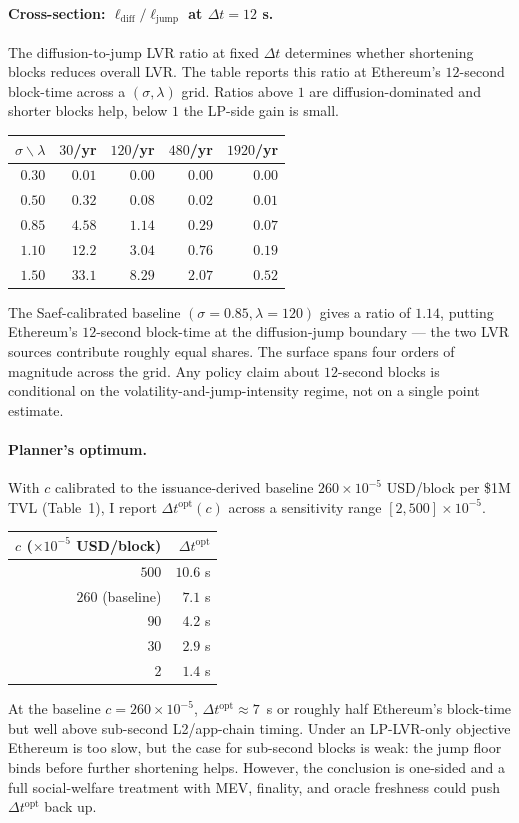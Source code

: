 \documentclass[runningheads]{llncs}
\newcommand{\dt}{\Delta t}
\newcommand{\1}{\mathbf{1}}
\begin{document}
\paragraph{Cross-section: $\ell_{\text{diff}}/\ell_{\text{jump}}$ at $\dt = 12$ s.}
The diffusion-to-jump LVR ratio at fixed $\dt$ determines whether shortening blocks reduces overall LVR. The table reports this ratio at Ethereum's $12$-second block-time across a $(\sigma, \lambda)$ grid. Ratios above $1$ are diffusion-dominated and shorter blocks help, below $1$ the LP-side gain is small.
\begin{center}
\begin{tabular}{r|rrrr}
\toprule
$\sigma\backslash\lambda$ & $30$/yr & $120$/yr & $480$/yr & $1920$/yr \\
\midrule
$0.30$ & $0.01$ & $0.00$ & $0.00$ & $0.00$ \\
$0.50$ & $0.32$ & $0.08$ & $0.02$ & $0.01$ \\
$0.85$ & $4.58$ & $1.14$ & $0.29$ & $0.07$ \\
$1.10$ & $12.2$ & $3.04$ & $0.76$ & $0.19$ \\
$1.50$ & $33.1$ & $8.29$ & $2.07$ & $0.52$ \\
\bottomrule
\end{tabular}
\end{center}
The Saef-calibrated baseline $(\sigma = 0.85,\lambda = 120)$ gives a ratio of $1.14$, putting Ethereum's $12$-second block-time at the diffusion-jump boundary --- the two LVR sources contribute roughly equal shares. The surface spans four orders of magnitude across the grid. Any policy claim about $12$-second blocks is conditional on the volatility-and-jump-intensity regime, not on a single point estimate.

\paragraph{Planner's optimum.}
With $c$ calibrated to the issuance-derived baseline $260 \times 10^{-5}$ USD/block per \$1M TVL (Table~1), I report $\dt^{\mathrm{opt}}(c)$ across a sensitivity range $[2, 500] \times 10^{-5}$.
\begin{center}
\begin{tabular}{rr}
\toprule
$c$ ($\times 10^{-5}$ USD/block) & $\dt^{\mathrm{opt}}$ \\
\midrule
$500$ & $10.6$ s \\
$260$ (baseline) & $7.1$ s \\
$90$ & $4.2$ s \\
$30$ & $2.9$ s \\
$2$ & $1.4$ s \\
\bottomrule
\end{tabular}
\end{center}
At the baseline $c = 260 \times 10^{-5}$, $\dt^{\mathrm{opt}} \approx 7$~s or roughly half Ethereum's block-time but well above sub-second L2/app-chain timing. Under an LP-LVR-only objective Ethereum is too slow, but the case for sub-second blocks is weak: the jump floor binds before further shortening helps. However, the conclusion is one-sided and a full social-welfare treatment with MEV, finality, and oracle freshness could push $\dt^{\mathrm{opt}}$ back up.
\end{document}
